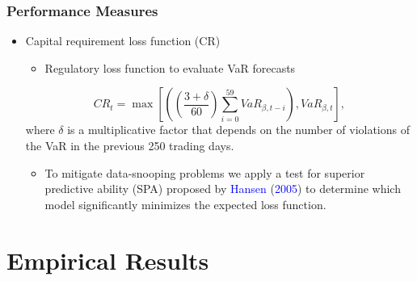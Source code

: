 \documentclass[pdf,10pt,xcolor=dvipsnames,hide notes]{beamer}
\begin{document}
\begin{frame}
\frametitle{Performance Measures}

\setlength{\parskip}{15pt}

	
	\begin{itemize}
	
	\item Capital requirement loss function (CR)
	
	\begin{itemize}
		\item Regulatory loss function to evaluate VaR forecasts
	\end{itemize}
	
	\begin{equation}CR_{t} =\max \left [\left (\genfrac{(}{)}{}{}{3 +\delta }{60}\sum _{i =0}^{59}VaR_{\beta  ,t -i}\right ) ,VaR_{\beta  ,t}\right ] ,
	\end{equation}where $\delta $ is a multiplicative factor that depends on the number of violations of the VaR in the previous 250 trading days.
	
	\begin{itemize}
		\item To mitigate data-snooping problems we apply a test for superior predictive ability (SPA) proposed by \textcolor{blue}{Hansen} (\textcolor{blue}{2005}) to determine which model significantly minimizes the expected loss function. 
	\end{itemize}

\end{itemize}
	
\end{frame}

\section{Empirical Results}
\end{document}
